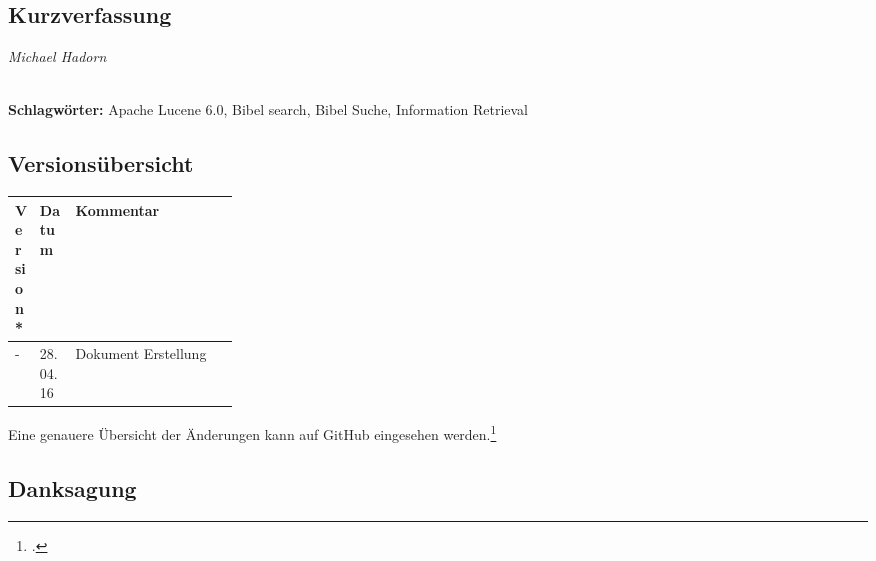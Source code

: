 
\subsection*{Kurzverfassung}

\begin{flushright}
	\textit{Michael Hadorn}	
\end{flushright}

\vfill

%
\mbox{}\\[0.5\baselineskip]\noindent
\textbf{Schlagwörter:} 
Apache Lucene 6.0, Bibel search, Bibel Suche, Information Retrieval

\newpage
\subsection*{Versionsübersicht}
\begin{center}
	\centering
	\small\renewcommand{\arraystretch}{1.4}
	\begin{tabularx}{1.0\textwidth}{ R{0.1\linewidth} | R{0.16\linewidth} | X  }%
		\hline
		\textbf{Version*} & \textbf{Datum} & \textbf{Kommentar}\\
		\hline
		- & 28.04.16 & Dokument Erstellung \\
		\hline
	\end{tabularx}
\end{center}
\vspace{-1.0\baselineskip}
{\footnotesize * Eine genauere Übersicht der Änderungen kann auf GitHub eingesehen werden.\footcite{github_bibleSearch_2016-05-07}}

\vfill

\subsection*{Danksagung}
